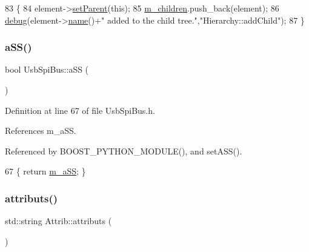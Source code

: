 \begin{DoxyCode}
83                                           \{
84   element->\hyperlink{classHierarchy_a585ad1aeec16077a0e532ab8b4fc557b}{setParent}(\textcolor{keyword}{this});
85   \hyperlink{classHierarchy_a038816763941fd4a930504917f60483b}{m\_children}.push\_back(element);
86   \hyperlink{classObject_aac010553f022165573714b7014a15f0d}{debug}(element->\hyperlink{classObject_a300f4c05dd468c7bb8b3c968868443c1}{name}()+\textcolor{stringliteral}{" added to the child tree."},\textcolor{stringliteral}{"Hierarchy::addChild"});
87 \}
\end{DoxyCode}
\mbox{\label{classUsbSpiBus_afd9b0823f348dddc7fed8ae97d248e9c}} 
\subsubsection{\texorpdfstring{a\+S\+S()}{aSS()}}
{\footnotesize\ttfamily bool Usb\+Spi\+Bus\+::a\+SS (\begin{DoxyParamCaption}{ }\end{DoxyParamCaption})\hspace{0.3cm}{\ttfamily [inline]}}



Definition at line 67 of file Usb\+Spi\+Bus.\+h.



References m\+\_\+a\+SS.



Referenced by B\+O\+O\+S\+T\+\_\+\+P\+Y\+T\+H\+O\+N\+\_\+\+M\+O\+D\+U\+L\+E(), and set\+A\+S\+S().


\begin{DoxyCode}
67 \{ \textcolor{keywordflow}{return} \hyperlink{classUsbSpiBus_ac98d088ac8aed042f65cbd918fc538ae}{m\_aSS}; \}
\end{DoxyCode}
\mbox{\label{classAttrib_aee7bbf16b144887f196e1341b24f8a26}} 
\subsubsection{\texorpdfstring{attributs()}{attributs()}}
{\footnotesize\ttfamily std\+::string Attrib\+::attributs (\begin{DoxyParamCaption}{ }\end{DoxyParamCaption})\hspace{0.3cm}{\ttfamily [inherited]}}

